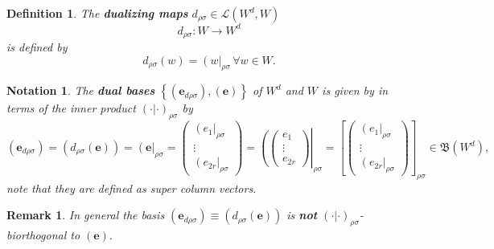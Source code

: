 \documentclass[aps,preprint]{revtex4}
\newtheorem{definition}[theorem]{Definition}
\newtheorem{notation}[theorem]{Notation}
\newtheorem{remark}[theorem]{Remark}
\begin{document}
\begin{definition}
The \textbf{dualizing maps }$d_{\rho \sigma }\in \mathcal{L}\left(
W^{d},W\right) $ 
\begin{equation}
d_{\rho \sigma }:W\rightarrow W^{d}
\end{equation}%
is defined by 
\begin{equation}
d_{\rho \sigma }\left( w\right) =\left( w\right\vert _{\rho \sigma
}\,\forall w\in W.
\end{equation}
\end{definition}

\begin{notation}
The \textbf{dual bases} $\left\{ \left( \boldsymbol{e}_{d\rho \sigma
}\right) ,\left( \boldsymbol{e}\right) \right\} $ of $W^{d}$ and $W$ is
given by in terms of the inner product $\left( \left. \boldsymbol{\cdot }%
\right\vert \boldsymbol{\cdot }\right) _{\rho \sigma }$ by 
\begin{equation*}
\left( \boldsymbol{e}_{d\rho \sigma }\right) =\left( \overset{}{d_{\rho
\sigma }\left( \boldsymbol{e}\right) }\right) =\left( \boldsymbol{e}%
\right\vert _{\rho \sigma }=\left( 
\begin{array}{c}
\left( e_{1}\right\vert _{\rho \sigma } \\ 
\vdots \\ 
\left( e_{2r}\right\vert _{\rho \sigma }%
\end{array}%
\right) =\left( \left( 
\begin{array}{c}
e_{1} \\ 
\vdots \\ 
e_{2r}%
\end{array}%
\right) \right\vert _{\rho \sigma }=\left[ \left( 
\begin{array}{c}
\left( e_{1}\right\vert _{\rho \sigma } \\ 
\vdots \\ 
\left( e_{2r}\right\vert _{\rho \sigma }%
\end{array}%
\right) \right] _{\rho \sigma }\in \mathfrak{B}\left( W^{d}\right) ,
\end{equation*}%
note that they are defined as super column vectors.
\end{notation}

\begin{remark}
In general the basis $\left( \boldsymbol{e}_{d\rho \sigma }\right) \equiv
\left( d_{\rho \sigma }\left( \boldsymbol{e}\right) \right) $ is \textbf{not}
$\left( \left. \boldsymbol{\cdot }\right\vert \boldsymbol{\cdot }\right)
_{\rho \sigma }$-biorthogonal to $\left( \boldsymbol{e}\right) .$
\end{remark}
\end{document}
